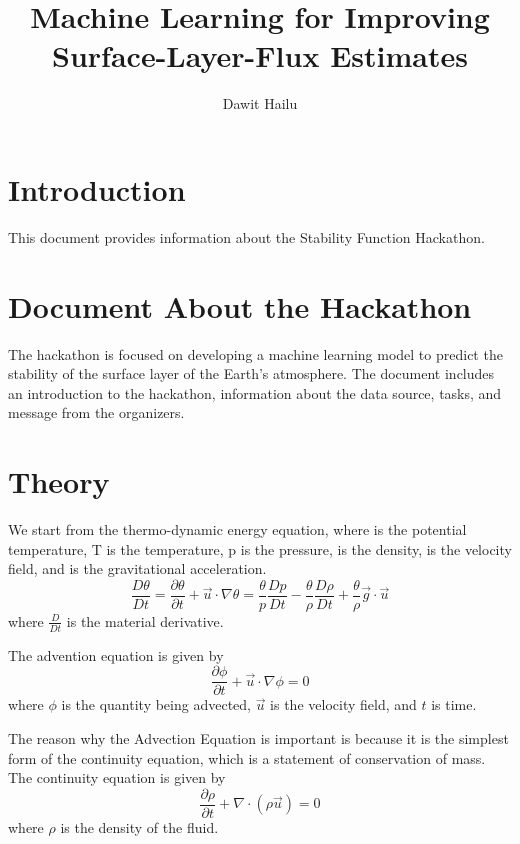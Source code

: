 \documentclass{article}
\title{Machine Learning for Improving Surface-Layer-Flux Estimates}
\author{Dawit Hailu}
\begin{document}
\maketitle

\section{Introduction}

This document provides information about the Stability Function Hackathon.

\section{Document About the Hackathon}

The hackathon is focused on developing a machine learning model to predict the stability of the surface layer of the Earth's atmosphere. The document includes an introduction to the hackathon, information about the data source, tasks, and message from the organizers.

\section{Theory}

We start from the thermo-dynamic energy equation, where \theta is the potential temperature, T is the temperature, p is the pressure, \rho is the density,  is the velocity field, and  is the gravitational acceleration.
\begin{equation}
\frac{D \theta}{D t} = \frac{\partial \theta}{\partial t} + \vec{u} \cdot \nabla \theta = \frac{\theta}{p} \frac{D p}{D t} - \frac{\theta}{\rho} \frac{D \rho}{D t} + \frac{\theta}{\rho} \vec{g} \cdot \vec{u}
\end{equation}
where $\frac{D}{D t}$ is the material derivative.

The advention equation is given by
\begin{equation}
\frac{\partial \phi}{\partial t} + \vec{u} \cdot \nabla \phi = 0
\end{equation}
where $\phi$ is the quantity being advected, $\vec{u}$ is the velocity field, and $t$ is time.

The reason why the Advection Equation is important is because it is the simplest form of the continuity equation, which is a statement of conservation of mass. The continuity equation is given by
\begin{equation}
\frac{\partial \rho}{\partial t} + \nabla \cdot (\rho \vec{u}) = 0
\end{equation}
where $\rho$ is the density of the fluid.
\end{document}
